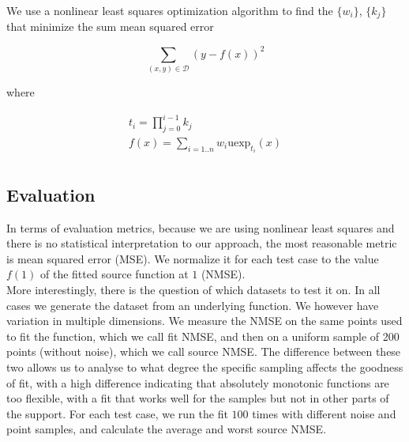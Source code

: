 \documentclass[12pt,a4paper]{article}
\newcommand{\uexp}[1] {{\text{uexp}_{#1}}}
\begin{document}
We use a nonlinear least squares optimization algorithm to find the $\{w_i\}$, $\{k_j\}$ that minimize the sum mean squared error 

\begin{equation}
\sum_{(x,y) \in \mathcal{D}} (y - f(x))^2
\end{equation}

\noindent where

\begin{equation}
\begin{array}{l}
t_i = \prod\limits_{j=0}^{i-1} k_j\\
f(x) = \sum\limits_{i=1..n} w_i \uexp{t_i}(x)\\
\end{array}
\end{equation}

\subsection{Evaluation}

In terms of evaluation metrics, because we are using nonlinear least squares and there is no statistical interpretation to our approach, the most reasonable metric is mean squared error (MSE). We normalize it for each test case to the value $f(1)$ of the fitted source function at $1$ (NMSE).\\

More interestingly, there is the question of which datasets to test it on. In all cases we generate the dataset from an underlying function. We however have variation in multiple dimensions. We measure the NMSE on the same points used to fit the function, which we call fit NMSE, and then on a uniform sample of 200 points (without noise), which we call source NMSE. The difference between these two allows us to analyse to what degree the specific sampling affects the goodness of fit, with a high difference indicating that absolutely monotonic functions are too flexible, with a fit that works well for the samples but not in other parts of the support. For each test case, we run the fit $100$ times with different noise and point samples, and calculate the average and worst source NMSE.
\end{document}
